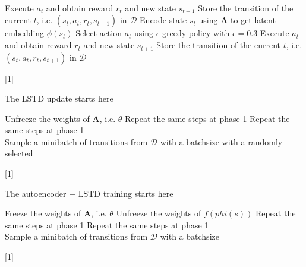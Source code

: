 \documentclass[a4paper,12pt,oneside]{article}
\numberwithin{equation}{section}
\begin{document}
\begin{algorithm}
\begin{algorithmic}[1]
                \State Execute $a_t$ and obtain reward $r_t$ and new state $s_{t+1}$
                \State Store the transition of the current \(t\), i.e. $(s_t, a_t, r_t, s_{t+1})$ in $\mathcal{D}$
                \State Encode state \(s_t\) using $\mathbf{A}$ to get latent embedding $\phi(s_t)$
                \State Select action $a_t$ using $\epsilon$-greedy policy with $\epsilon=0.3$
                \State Execute $a_t$ and obtain reward $r_t$ and new state $s_{t+1}$
                \State Store the transition of the current \(t\), i.e. $(s_t, a_t, r_t, s_{t+1})$ in $\mathcal{D}$
            \EndFor
        \EndFor
        \end{algorithmic}[1]
    \end{algorithm}
    
    \clearpage
    \begin{algorithm}
    \caption{The LSTD update starts here}
        \begin{algorithmic}[1]
        \State Unfreeze the weights of $\mathbf{A}$, i.e. $\theta$
            \State Repeat the same steps at phase 1
                \State Repeat the same steps at phase 1
                \\
                \State Sample a minibatch of transitions from $\mathcal{D}$ with a batchsize with a randomly selected  \

            \EndFor
        \EndFor
        \end{algorithmic}[1]
    \end{algorithm}

    \clearpage
    \begin{algorithm}
    \caption{The autoencoder + LSTD training starts here}
        \begin{algorithmic}[1]
        \State Freeze the weights of $\mathbf{A}$, i.e. $\theta$
        \State Unfreeze the weights of \(f(phi(s))\)
            \State Repeat the same steps at phase 1
                \State Repeat the same steps at phase 1
                \\
                \State Sample a minibatch of transitions from $\mathcal{D}$ with a batchsize \
            \EndFor
        \EndFor
        \end{algorithmic}[1]    
    \end{algorithm}
\end{document}
